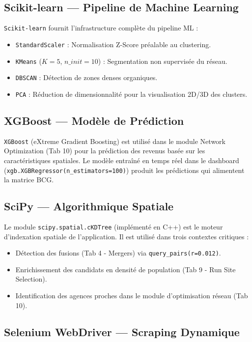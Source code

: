 \subsection{Scikit-learn — Pipeline de Machine Learning}

\texttt{Scikit-learn} fournit l'infrastructure complète du pipeline ML :
\begin{itemize}
    \item \texttt{StandardScaler} : Normalisation Z-Score préalable au clustering.
    \item \texttt{KMeans} ($K=5$, $n\_init=10$) : Segmentation non supervisée du réseau.
    \item \texttt{DBSCAN} : Détection de zones denses organiques.
    \item \texttt{PCA} : Réduction de dimensionnalité pour la visualisation 2D/3D des clusters.
\end{itemize}

\subsection{XGBoost — Modèle de Prédiction}

\texttt{XGBoost} (eXtreme Gradient Boosting) est utilisé dans le module Network Optimization (Tab 10) pour la prédiction des revenus basée sur les caractéristiques spatiales. Le modèle entraîné en temps réel dans le dashboard (\texttt{xgb.XGBRegressor(n\_estimators=100)}) produit les prédictions qui alimentent la matrice BCG.

\subsection{SciPy — Algorithmique Spatiale}

Le module \texttt{scipy.spatial.cKDTree} (implémenté en C++) est le moteur d'indexation spatiale de l'application. Il est utilisé dans trois contextes critiques :
\begin{itemize}
    \item Détection des fusions (Tab 4 - Mergers) via \texttt{query\_pairs(r=0.012)}.
    \item Enrichissement des candidats en densité de population (Tab 9 - Run Site Selection).
    \item Identification des agences proches dans le module d'optimisation réseau (Tab 10).
\end{itemize}

\subsection{Selenium WebDriver — Scraping Dynamique}

